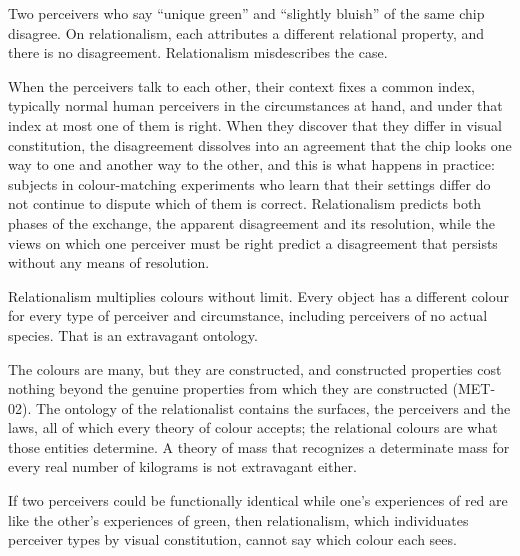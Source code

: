 \documentclass{situationist-preprint}
\begin{document}
\begin{objection}[Disagreement]
Two perceivers who say \enquote{unique green} and \enquote{slightly bluish} of the same chip disagree. On relationalism, each attributes a different relational property, and there is no disagreement. Relationalism misdescribes the case.
\end{objection}

\begin{reply}
When the perceivers talk to each other, their context fixes a common index, typically normal human perceivers in the circumstances at hand, and under that index at most one of them is right. When they discover that they differ in visual constitution, the disagreement dissolves into an agreement that the chip looks one way to one and another way to the other, and this is what happens in practice: subjects in colour-matching experiments who learn that their settings differ do not continue to dispute which of them is correct. Relationalism predicts both phases of the exchange, the apparent disagreement and its resolution, while the views on which one perceiver must be right predict a disagreement that persists without any means of resolution.
\end{reply}

\begin{objection}[Proliferation]
Relationalism multiplies colours without limit. Every object has a different colour for every type of perceiver and circumstance, including perceivers of no actual species. That is an extravagant ontology.
\end{objection}

\begin{reply}
The colours are many, but they are constructed, and constructed properties cost nothing beyond the genuine properties from which they are constructed (MET-02). The ontology of the relationalist contains the surfaces, the perceivers and the laws, all of which every theory of colour accepts; the relational colours are what those entities determine. A theory of mass that recognizes a determinate mass for every real number of kilograms is not extravagant either.
\end{reply}

\begin{objection}
If two perceivers could be functionally identical while one's experiences of red are like the other's experiences of green, then relationalism, which individuates perceiver types by visual constitution, cannot say which colour each sees.
\end{objection}
\end{document}

